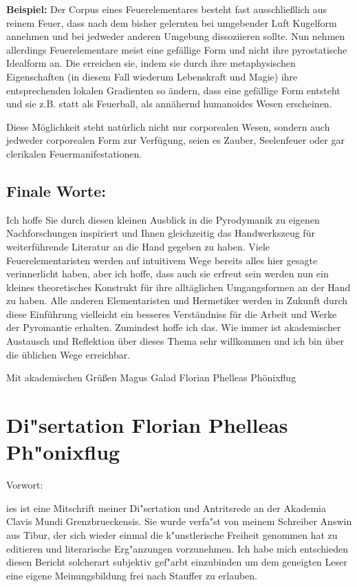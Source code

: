 \documentclass[a5paper,8pt]{book}
\begin{document}
\textbf{Beispiel:}
Der Corpus eines Feuerelementares besteht fast ausschließlich aus reinem Feuer, dass nach dem bisher gelernten bei 
umgebender Luft Kugelform annehmen und bei jedweder anderen Umgebung dissoziieren sollte. Nun nehmen allerdings 
Feuerelementare meist eine gefällige Form und nicht ihre pyrostatische Idealform an. Die erreichen sie, indem sie durch 
ihre metaphysischen Eigenschaften (in diesem Fall wiederum Lebenskraft und Magie) ihre entsprechenden lokalen Gradienten 
so ändern, dass eine gefällige Form entsteht und sie z.B. statt als Feuerball, als annähernd humanoides Wesen erscheinen.

Diese Möglichkeit steht natürlich nicht nur corporealen Wesen, sondern auch jedweder corporealen Form zur Verfügung, seien 
es Zauber, Seelenfeuer oder gar clerikalen Feuermanifestationen.

\subsection{Finale Worte:}
Ich hoffe Sie durch diesen kleinen Ausblick in die Pyrodymanik zu eigenen Nachforschungen inspiriert und Ihnen gleichzeitig 
das Handwerkszeug für weiterführende Literatur an die Hand gegeben zu haben.
Viele Feuerelementaristen werden auf intuitivem Wege bereits alles hier gesagte verinnerlicht haben, aber ich hoffe, dass
auch sie erfreut sein werden nun ein kleines theoretisches Konstrukt für ihre alltäglichen Umgangsformen an der Hand zu 
haben.
Alle anderen Elementaristen und Hermetiker werden in Zukunft durch diese Einführung vielleicht ein besseres Verständniss 
für die Arbeit und Werke der Pyromantie erhalten.
Zumindest hoffe ich das.
Wie immer ist akademischer Austausch und Reflektion über dieses Thema sehr willkommen und ich bin über die üblichen Wege 
erreichbar.

Mit akademischen Grüßen
Magus Galad Florian Phelleas Phönixflug

\newpage


\section{\fraklines Di"sertation Florian Phelleas Ph"onixflug}

Vorwort: 

ies ist eine Mitschrift meiner Di"sertation und Antritsrede an der Akademia Clavis Mundi Grenzbrueckensis. Sie wurde verfa"st von meinem Schreiber Answin aus Tibur, der sich wieder einmal die k"unstlerische Freiheit genommen hat zu editieren und literarische Erg"anzungen vorzunehmen. Ich habe mich entschieden diesen Bericht solcherart subjektiv gef"arbt einzubinden um dem geneigten Leser eine eigene Meinungsbildung frei nach Stauffer zu erlauben.
\end{document}
